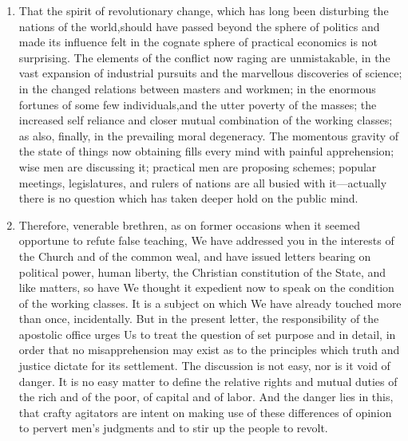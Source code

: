 \documentclass{book}
\begin{document}
\begin{enumerate}
	\item That the spirit of revolutionary change, which has long been disturbing the nations of the world,should have passed beyond the sphere of politics and made its influence felt in the cognate sphere of practical economics is not surprising. The elements of the conflict now raging are unmistakable, in the vast expansion of industrial pursuits and the marvellous discoveries of science; in the changed relations between masters and workmen; in the enormous fortunes of some few individuals,and the utter poverty of the masses; the increased self reliance and closer mutual combination of the working classes; as also, finally, in the prevailing moral degeneracy. The momentous gravity of the state of things now obtaining fills every mind with painful apprehension; wise men are discussing it; practical men are proposing schemes; popular meetings, legislatures, and rulers of nations are all busied with it—actually there is no question which has taken deeper hold on the public mind.


	\item Therefore, venerable brethren, as on former occasions when it seemed opportune to refute false teaching, We have addressed you in the interests of the Church and of the common weal, and have issued letters bearing on political power, human liberty, the Christian constitution of the State, and like matters, so have We thought it expedient now to speak on the condition of the working classes. It is a subject on which We have already touched more than once, incidentally. But in the present letter, the responsibility of the apostolic office urges Us to treat the question of set purpose and in detail, in order that no misapprehension may exist as to the principles which truth and justice dictate for its settlement. The discussion is not easy, nor is it void of danger. It is no easy matter to define the relative rights and mutual duties of the rich and of the poor, of capital and of labor. And the danger lies in this, that crafty agitators are intent on making use of these differences of opinion to pervert men’s judgments and to stir up the people to revolt.



\end{enumerate}
\end{document}
